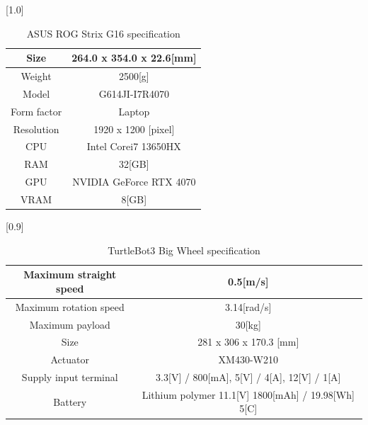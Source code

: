 \begin{table}[h]
  \begin{center}
    \caption{{ASUS ROG Strix G16 specification}\label{ASUS ROG Strix G16 specification}}
    \scalebox{1.2}[1.0]{
      \begin{tabular}{c|c} \hline
        Size & 264.0 x 354.0 x 22.6[mm]  \\ \hline
        Weight & 2500[g] \\ \hline
        Model & G614JI-I7R4070 \\ \hline
        Form factor & Laptop \\ \hline
        Resolution & 1920 x 1200 [pixel] \\ \hline
        CPU & Intel Corei7 13650HX \\ \hline
        RAM & 32[GB] \\ \hline
        GPU & NVIDIA GeForce RTX 4070 \\ \hline
        VRAM & 8[GB] \\ \hline
      \end{tabular}
    }
  \end{center}
\end{table}

\begin{table}[h]
  \begin{center}
    \caption{{TurtleBot3 Big Wheel specification}\label{TurtleBot3 Big Wheel specification}}
    \scalebox{1.0}[0.9]{
      \begin{tabular}{c|c} \hline
        Maximum straight speed & 0.5[m/s] \\ \hline
        Maximum rotation speed & 3.14[rad/s] \\ \hline
        Maximum payload & 30[kg] \\ \hline
        Size & 281 x 306 x 170.3 [mm] \\ \hline
        Actuator & XM430-W210 \\ \hline
        Supply input terminal & 3.3[V] / 800[mA], 5[V] / 4[A], 12[V] / 1[A] \\ \hline
        Battery & Lithium polymer 11.1[V] 1800[mAh] / 19.98[Wh] 5[C] \\ \hline
      \end{tabular}
    }
  \end{center}
\end{table}

